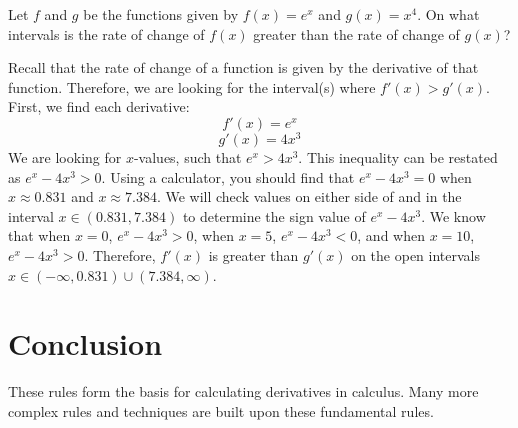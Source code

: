 \begin{Exercise}
	Let $f$ and $g$ be the functions given by $f(x) = e^{x}$ and $g(x) = 
	x^4$. On what intervals is the rate of change of $f(x)$ greater than 
	the rate of change of $g(x)$?
\end{Exercise}

\begin{Answer}[ref=deriv_rules11]
	Recall that the rate of change of a function is given by the 
	derivative of that function. Therefore, we are looking for the
	interval(s) where $f'(x) > g'(x)$. First, we find each derivative:
	$$f'(x) = e^x$$
	$$g'(x) = 4x^3$$
	We are looking for $x$-values, such that $e^x > 4x^3$. This inequality 
	can be restated as $e^x - 4x^3 > 0$. Using a calculator, you should 
	find that $e^x - 4x^3 = 0$ when $x \approx 0.831$ and $x \approx 
	7.384$. We will check values on either side of and in the interval 
	$x\in(0.831, 7.384)$ to determine the sign value of $e^x - 4x^3$. 
	We know that when $x = 0$, $e^x - 4x^3 > 0$, when $x = 5$, $e^x - 
	4x^3 < 0$, and when $x=10$, $e^x - 4x^3 > 0$. Therefore, $f'(x)$ is 
	greater than $g'(x)$ on the open intervals $x \in (-\infty, 0.831) 
	\cup (7.384, \infty)$.
\end{Answer}

\section{Conclusion}

These rules form the basis for calculating derivatives in
calculus. Many more complex rules and techniques are built upon these
fundamental rules.
